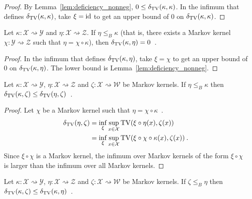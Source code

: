 \begin{proof}%
{}
By Lemma~\ref{lem:deficiency_nonneg}, $0 \le \delta_{\operatorname{TV}}(\kappa, \kappa)$.
In the infimum that defines $\delta_{\operatorname{TV}}(\kappa, \kappa)$, take $\xi = \textup{id}$ to get an upper bound of 0 on $\delta_{\operatorname{TV}}(\kappa, \kappa)$.
\end{proof}

\begin{lemma}
  \label{lem:deficiency_comp}
  Let $\kappa: \mathcal X \rightsquigarrow \mathcal Y$ and $\eta : \mathcal X \rightsquigarrow \mathcal Z$.
  If $\eta \le_B \kappa$ (that is, there exists a Markov kernel $\chi : \mathcal Y \rightsquigarrow \mathcal Z$ such that $\eta = \chi \circ \kappa$), then $\delta_{\operatorname{TV}}(\kappa, \eta) = 0$~.
\end{lemma}

\begin{proof}%
{}
In the infimum that defines $\delta_{\operatorname{TV}}(\kappa, \eta)$, take $\xi = \chi$ to get an upper bound of 0 on $\delta_{\operatorname{TV}}(\kappa, \eta)$. The lower bound is Lemma~\ref{lem:deficiency_nonneg}.
\end{proof}

\begin{lemma}
  \label{lem:deficiency_antimono_left}
  Let $\kappa: \mathcal X \rightsquigarrow \mathcal Y$, $\eta : \mathcal X \rightsquigarrow \mathcal Z$ and $\zeta : \mathcal X \rightsquigarrow \mathcal W$ be Markov kernels.
  If $\eta \le_B \kappa$ then $\delta_{\operatorname{TV}}(\kappa, \zeta) \le \delta_{\operatorname{TV}}(\eta, \zeta)$~.
\end{lemma}

\begin{proof}%
\uses{}
Let $\chi$ be a Markov kernel such that $\eta = \chi \circ \kappa$~.
\begin{align*}
\delta_{\operatorname{TV}}(\eta, \zeta)
&= \inf_{\xi} \sup_{x \in \mathcal X} \operatorname{TV}(\xi \circ \eta (x), \zeta(x))
\\
&= \inf_\xi \sup_{x \in \mathcal X} \operatorname{TV}(\xi \circ \chi \circ \kappa (x), \zeta(x))
\: .
\end{align*}
Since $\xi \circ \chi$ is a Markov kernel, the infimum over Markov kernels of the form $\xi \circ \chi$ is larger than the infimum over all Markov kernels.
\end{proof}

\begin{lemma}
  \label{lem:deficiency_mono_right}
  Let $\kappa: \mathcal X \rightsquigarrow \mathcal Y$, $\eta : \mathcal X \rightsquigarrow \mathcal Z$ and $\zeta : \mathcal X \rightsquigarrow \mathcal W$ be Markov kernels.
  If $\zeta \le_B \eta$ then $\delta_{\operatorname{TV}}(\kappa, \zeta) \le \delta_{\operatorname{TV}}(\kappa, \eta)$~.
\end{lemma}

